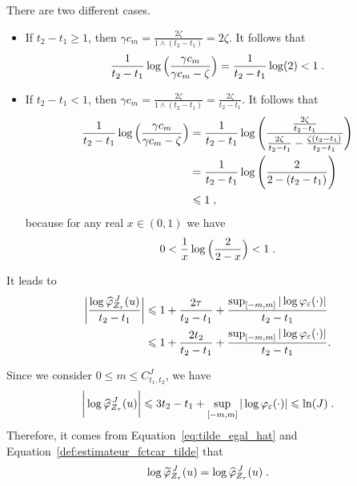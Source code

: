 There are two different cases. 
\begin{itemize}
\item If $t_2 - t_1 \geq 1$, then $\gamma c_m = \frac{2 \zeta}{1 \wedge (t_2 - t_1)} = 2 \zeta$.
It follows that
\begin{equation*}
\frac{1}{t_2 - t_1}
\log \Big( \frac{\gamma c_m}{\gamma c_m- \zeta}\Big)
= 
\frac{1}{t_2 - t_1} \log(2) < 1
\eqfinp
\end{equation*}
\item If $t_2 - t_1 < 1$, then $\gamma c_m = \frac{2 \zeta}{1 \wedge (t_2 - t_1)} = \frac{2 \zeta}{t_2 - t_1} $. 
It follows that 
	\begin{subequations}
	\begin{align*}
	 \frac{1}{t_2 - t_1}
	 \log \Big( \frac{\gamma c_m}{\gamma c_m- \zeta}\Big)
	 &= 
	 \frac{1}{t_2 - t_1} \log \Bigg( \frac{\frac{2 \zeta}{t_2 - t_1}}{\frac{2 \zeta}{t_2 - t_1} - \frac{\zeta (t_2 - t_1)}{t_2 - t_1}  } \Bigg) \\
	 &= \frac{1}{t_2 - t_1} \log \Bigg( \frac{2}{2 - (t_2 - t_1)} \Bigg)\\
	 &\leq 1
	 \eqfinv
	 \end{align*}
	\end{subequations}
because for any real $x \in (0, 1)$ we have
	\begin{equation*}
	0 < \frac{1}{x}\log\Big(\frac{2}{2-x}\Big) < 1
	\eqfinp
	\end{equation*}
\end{itemize}


It leads to 
\begin{align}
	\bigg| \frac{\log \hat \varphi_{Z_\tau}^{\, J}(u)}{t_2 - t_1} \bigg|
	&\leq 1 + \frac{2 \tau}{t_2 - t_1} + \frac{\sup_{[-m, m]}{| \log \varphi_{\varepsilon}(\cdot)|}}{t_2 - t_1} \notag{}\\
    &\leq 1 + \frac{2 t_2}{t_2 - t_1} + \frac{\sup_{[-m, m]}{| \log \varphi_{\varepsilon}(\cdot)|}}{t_2 - t_1}.
	        \label{eq:tilde_egal_hat}
\end{align}

Since we consider $0 \leq m \leq C_{t_1, t_2}^J$, we have
	\begin{equation*}
	\bigg|\log \hat \varphi_{Z_\tau}^{\, J}(u)\bigg| 
	\leq 3t_2 - t_1 + \sup_{[-m, m]}{| \log \varphi_{\varepsilon}(\cdot)|}
	\leq \ln(J)
    \eqfinp
	\end{equation*}
Therefore, it comes from Equation~\eqref{eq:tilde_egal_hat} and Equation~\eqref{def:estimateur_fctcar_tilde} that 
	\begin{equation*}
	\log \tilde \varphi_{Z_{\tau}}^{\, J}  (u)  = \log \hat \varphi_{Z_{\tau}}^{\,J} (u)
	\eqfinp
	\end{equation*}


